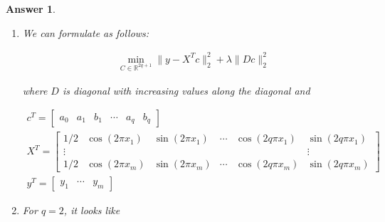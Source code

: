 \documentclass[12pt]{article}
\theoremstyle{colon}
\newtheorem*{answer}{Answer}
\begin{document}
\begin{answer}
  \

  \begin{enumerate}[label=\alph*)]
    \item We can formulate as follows:

      \begin{gather*}
        \min_{C \in \mathbb{R}^{2q + 1}} \lVert y - X^T c \rVert_2^2 + \lambda \lVert D c \rVert_2^2
      \end{gather*}

      where $D$ is diagonal with increasing values along the diagonal and

      \begin{gather*}
        c^T = \begin{bmatrix} a_0 & a_1 & b_1 & \dotsm & a_q & b_q \end{bmatrix} \\
        X^T = \begin{bmatrix} 1/2 & \cos(2 \pi x_1) & \sin(2 \pi x_1) & \dotsm & \cos(2 q \pi x_1) & \sin(2 q \pi x_1) \\ \vdots & & & & & \vdots \\ 1/2 & \cos(2 \pi x_m) & \sin(2 \pi x_m) & \dotsm & \cos(2 q \pi x_m) & \sin(2 q \pi x_m) \end{bmatrix} \\
        y^T = \begin{bmatrix} y_1 & \dotsm & y_m \end{bmatrix}
      \end{gather*}

    \item For $q = 2$, it looks like


\end{enumerate}
\end{answer}
\end{document}
